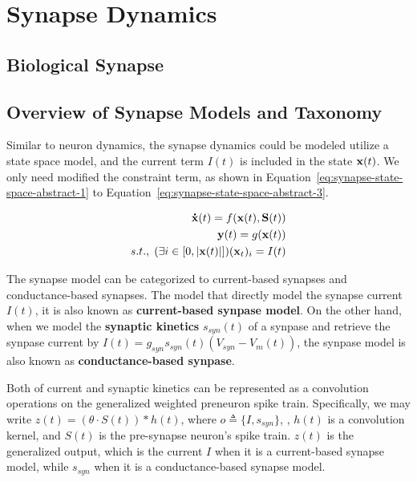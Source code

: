 
\chapter{Synapse Dynamics}
\section{Biological Synapse}

\section{Overview of Synapse Models and Taxonomy}
Similar to neuron dynamics, the synapse dynamics could be modeled utilize a state space model,
and the current term $I(t)$ is included in the state $\bold x(t)$. We only need modified the 
constraint term, as shown in Equation~\ref{eq:synapse-state-space-abstract-1} to 
Equation~\ref{eq:synapse-state-space-abstract-3}. 

\begin{align}
    \bold{\dot x}(t) = f(\bold x(t), \bold S(t)) \label{eq:synapse-state-space-abstract-1} \\
    \bold y(t) = g(\bold x(t)) \label{eq:synapse-state-space-abstract-2} \\
    s.t.,\; (\exists i \in [0, |\bold x(t)|])(\bold x_{t})_{i} = I(t) \label{eq:synapse-state-space-abstract-3}\\
\end{align}

The synapse model can be categorized to current-based synapses and 
conductance-based synapses. 
The model that directly model the synapse current $I(t)$, it is also known as \textbf{current-based synpase model}.
On the other hand, when we model the \textbf{synaptic kinetics} $s_{syn}(t)$ of a synpase and retrieve the 
synpase current by $I(t) = g_{syn}s_{syn}(t)(V_{syn} - V_m(t))$, the synpase model is also known as 
\textbf{conductance-based synpase}.
  
Both of current and synaptic kinetics can be represented as a convolution operations on
 the generalized weighted preneuron spike train.
Specifically, we may write $z(t)=(\theta\cdot S(t)) * h(t)$, where $o\triangleq \{I, s_{syn}\}$, 
, $h(t)$ is a convolution kernel, and $S(t)$ is the pre-synapse neuron's spike train. $z(t)$ is 
the generalized output, which is the current $I$ when it is a current-based synapse model, 
while $s_{syn}$ when it is a conductance-based synapse model.


